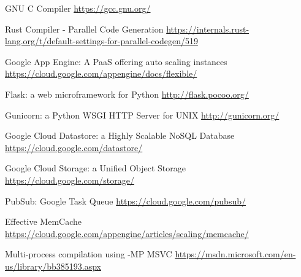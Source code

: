 \documentclass[conference]{IEEEtran}
\begin{document}
\begin{thebibliography}{00}

    GNU C Compiler
    \url{https://gcc.gnu.org/}
    
    Rust Compiler - Parallel Code Generation
    \url{https://internals.rust-lang.org/t/default-settings-for-parallel-codegen/519}


    Google App Engine: A PaaS offering auto scaling instances
    \url{https://cloud.google.com/appengine/docs/flexible/}

    Flask: a web microframework for Python
    \url{http://flask.pocoo.org/} 

    Gunicorn: a Python WSGI HTTP Server for UNIX
    \url{http://gunicorn.org/}

    Google Cloud Datastore: a Highly Scalable NoSQL Database
    \url{https://cloud.google.com/datastore/}

    Google Cloud Storage: a Unified Object Storage
    \url{https://cloud.google.com/storage/}

   PubSub: Google Task Queue
    \url{https://cloud.google.com/pubsub/}
    
   Effective MemCache
    \url{https://cloud.google.com/appengine/articles/scaling/memcache/} 
    
 	Multi-process compilation using -MP MSVC
 	\url{https://msdn.microsoft.com/en-us/library/bb385193.aspx}

\end{thebibliography}
\end{document}
